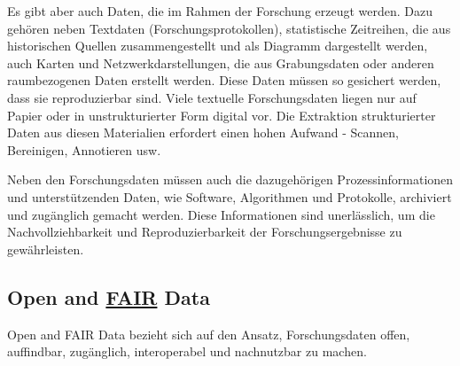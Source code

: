 \documentclass[
  letterpaper,
  DIV=11,
  numbers=noendperiod,
  landscape,
  a4paper,
  geometry:margin=1in]{scrartcl}
\begin{document}
Es gibt aber auch Daten, die im Rahmen der Forschung erzeugt werden.
Dazu gehören neben Textdaten (Forschungsprotokollen), statistische
Zeitreihen, die aus historischen Quellen zusammengestellt und als
Diagramm dargestellt werden, auch Karten und Netzwerkdarstellungen, die
aus Grabungsdaten oder anderen raumbezogenen Daten erstellt werden.
Diese Daten müssen so gesichert werden, dass sie reproduzierbar sind.
Viele textuelle Forschungsdaten liegen nur auf Papier oder in
unstrukturierter Form digital vor. Die Extraktion strukturierter Daten
aus diesen Materialien erfordert einen hohen Aufwand - Scannen,
Bereinigen, Annotieren usw.

Neben den Forschungsdaten müssen auch die dazugehörigen
Prozessinformationen und unterstützenden Daten, wie Software,
Algorithmen und Protokolle, archiviert und zugänglich gemacht werden.
Diese Informationen sind unerlässlich, um die Nachvollziehbarkeit und
Reproduzierbarkeit der Forschungsergebnisse zu gewährleisten.

\subsection{\texorpdfstring{Open and
\href{https://www.go-fair.org/fair-principles/}{FAIR}
Data}{Open and FAIR Data}}\label{open-and-fair-data}

Open and FAIR Data bezieht sich auf den Ansatz, Forschungsdaten offen,
auffindbar, zugänglich, interoperabel und nachnutzbar zu machen.
\end{document}
